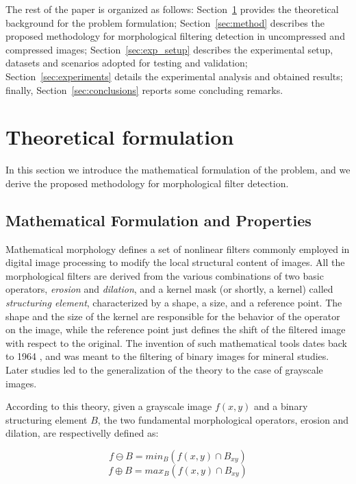 \documentclass[review]{elsarticle}
\begin{document}
The rest of the paper is organized as follows: Section~\ref{sec:theory} provides the theoretical background for the problem formulation; Section~\ref{sec:method} describes the proposed methodology for morphological filtering detection in uncompressed and compressed images; Section~\ref{sec:exp_setup} describes the experimental setup, datasets and scenarios adopted for testing and validation; Section~\ref{sec:experiments} details the experimental analysis and obtained results; finally, Section~\ref{sec:conclusions} reports some concluding remarks.   

\section{Theoretical formulation}
\label{sec:theory}
In this section we introduce the mathematical formulation of the problem, and we derive the proposed methodology for morphological filter detection. 

\subsection{Mathematical Formulation and Properties}
Mathematical morphology defines a set of nonlinear filters commonly employed in digital image processing to modify the local structural content of images. All the morphological filters are derived from the various combinations of two basic operators, \textit{erosion} and \textit{dilation}, and a kernel mask (or shortly, a kernel) called \textit{structuring element}, characterized by a shape, a size, and a reference point. The shape and the size of the kernel are responsible for the behavior of the operator on the image, while the reference point just defines the shift of the filtered image with respect to the original. The invention of such mathematical tools dates back to 1964 \cite{haas1967morphologie}, and was meant to the filtering of binary images for mineral studies. Later studies \cite{nakagawa1977note} led to the generalization of the theory to the case of grayscale images.

According to this theory, given a grayscale image $f(x,y)$ and a binary structuring element $B$, the two fundamental morphological operators, erosion and dilation, are respectivelly defined as:

\begin{equation} \label{eq:erode}
f \ominus B = min_B(f(x,y) \cap B_{xy})
\end{equation}
\begin{equation} \label{eq:dilate}
f \oplus B = max_B(f(x,y) \cap B_{xy})
\end{equation}
\end{document}
